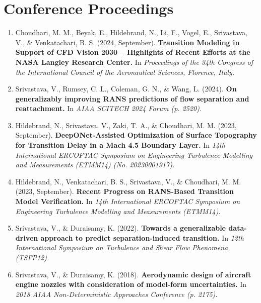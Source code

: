 \documentclass[letterpaper, 11pt]{article}
\begin{document}
  \section{Conference Proceedings}
  {
    \small
    \begin{enumerate}
      \item
      Choudhari, M. M., Beyak, E., Hildebrand, N., Li, F., Vogel, E., Srivastava, V., \& Venkatachari, B. S. (2024, September).%
      \textbf{
        Transition Modeling in Support of CFD Vision 2030 -- Highlights of Recent Efforts at the NASA Langley Research Center.
      }In\textit{
        Proceedings of the 34th Congress of the International Council of the Aeronautical Sciences, Florence, Italy.
      }

      \item
      Srivastava, V., Rumsey, C. L., Coleman, G. N., \& Wang, L. (2024).%
      \textbf{
        On generalizably improving RANS predictions of flow separation and reattachment.
      }In\textit{
        AIAA SCITECH 2024 Forum (p. 2520).
      }

      \item
      Hildebrand, N., Srivastava, V., Zaki, T. A., \& Choudhari, M. M. (2023, September).%
      \textbf{
        DeepONet-Assisted Optimization of Surface Topography for Transition Delay in a Mach 4.5
        Boundary Layer.
      }In\textit{
        14th International ERCOFTAC Symposium on Engineering Turbulence Modelling and
        Measurements (ETMM14) (No. 20230001917).
      }

      \item
      Hildebrand, N., Venkatachari, B. S., Srivastava, V., \& Choudhari, M. M. (2023, September).%
      \textbf{
        Recent Progress on RANS-Based Transition Model Verification.
      }In\textit{
        14th International ERCOFTAC Symposium on Engineering Turbulence Modelling 
        and Measurements (ETMM14).
      }

      \item
      Srivastava, V., \& Duraisamy, K. (2022).%
      \textbf{
        Towards a generalizable data-driven approach to predict separation-induced transition.
      }In\textit{
        12th International Symposium on Turbulence and Shear Flow Phenomena (TSFP12).
      }

      \item
      Srivastava, V., \& Duraisamy, K. (2018).%
      \textbf{
        Aerodynamic design of aircraft engine nozzles with consideration of model-form uncertainties.
      }In\textit{
        2018 AIAA Non-Deterministic Approaches Conference (p. 2175).
      }
    \end{enumerate}
  }
\end{document}
